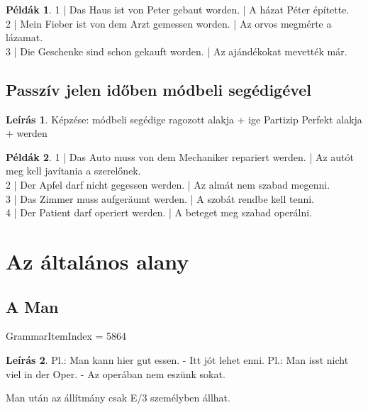 \documentclass{article}
\theoremstyle{definition}
\newtheorem*{exmp}{Példák}
\newtheorem*{desc}{Leírás}
\begin{document}
\begin{exmp}
1 | Das Haus ist von Peter gebaut worden. | A házat Péter építette.\\
2 | Mein Fieber ist von dem Arzt gemessen worden. | Az orvos megmérte a lázamat.\\
3 | Die Geschenke sind schon gekauft worden. | Az ajándékokat mevették már.\\
\end{exmp}

\subsection{Passzív jelen időben módbeli segédigével}

\begin{desc}
Képzése: módbeli segédige ragozott alakja + ige Partizip Perfekt alakja + werden
\end{desc}

\begin{exmp}
1 | Das Auto muss von dem Mechaniker repariert werden. | Az autót meg kell javítania a szerelőnek.\\
2 | Der Apfel darf nicht gegessen werden. | Az almát nem szabad megenni.\\
3 | Das Zimmer muss aufgeräumt werden. | A szobát rendbe kell tenni.\\
4 | Der Patient darf operiert werden. | A beteget meg szabad operálni.\\
\end{exmp}

\section{Az általános alany}

\subsection{A Man}

GrammarItemIndex = 5864

\begin{desc}
Pl.: Man kann hier gut essen. - Itt jót lehet enni.
Pl.: Man isst nicht viel in der Oper. - Az operában nem eszünk sokat. 

Man után az állítmány csak E/3 személyben állhat.
\end{desc}
\end{document}
